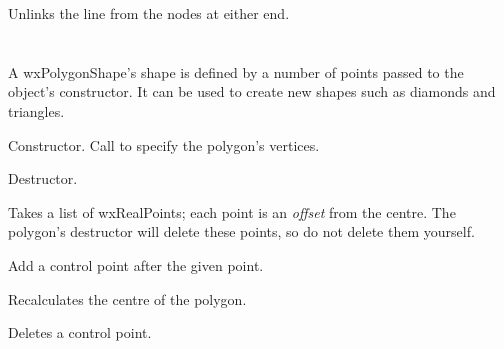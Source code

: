 

Unlinks the line from the nodes at either end.

\section{}\label{wxpolygonshape}

A wxPolygonShape's shape is defined by a number of points passed to the object's
constructor. It can be used to create new shapes such as diamonds and triangles.






Constructor. Call  to specify the polygon's vertices.



Destructor.

\label{wxpolygonshapecreate}


Takes a list of wxRealPoints; each point is an {\it offset} from the centre.
The polygon's destructor will delete these points, so do not delete them yourself.



Add a control point after the given point.



Recalculates the centre of the polygon.



Deletes a control point.


